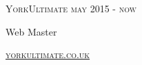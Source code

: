 {
    \textsc{\small{YorkUltimate
            \hfill
            {\raggedleft
                may 2015 - now
            }
        }
    }

    {\raggedright\large {
        Web Master
    } \\}

    \textsc{\small\href{http://www.yorkultimate.co.uk}{yorkultimate.co.uk}}
} \\
